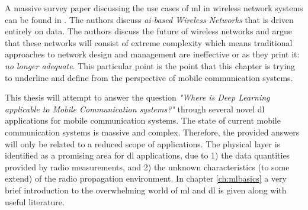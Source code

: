 A massive survey paper discussing the use cases of \gls{ml} in wireless network systems can be found in \cite{Zappone2019}. The authors discuss \emph{\gls{ai}-based Wireless Networks} that is driven entirely on data. The authors discuss the future of wireless networks and argue that these networks will consist of extreme complexity which means traditional approaches to network design and management are ineffective or as they print it: \emph{no longer adequate}. This particular point is the point that this chapter is trying to underline and define from the perspective of mobile communication systems. 



This thesis will attempt to answer the question \emph{"Where is Deep Learning applicable to Mobile Communication systems?"} through several novel \gls{dl} applications for mobile communication systems. The state of current mobile communication systems is massive and complex. Therefore, the provided answers will only be related to a reduced scope of applications. The physical layer is identified as a promising area for \gls{dl} applications, due to 1) the data quantities provided by radio measurements, and 2) the unknown characteristics (to some extend) of the radio propagation environment.  In chapter \ref{ch:mlbasics} a very brief introduction to the overwhelming world of \gls{ml} and \gls{dl} is given along with useful literature. 